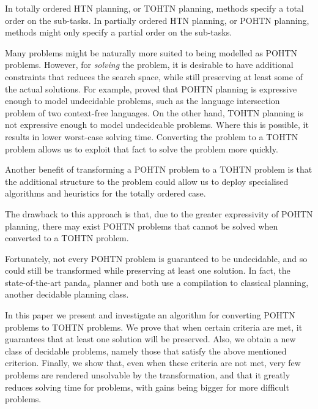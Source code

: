\documentclass[letterpaper]{article} %
\begin{document}
In totally ordered HTN planning, or TOHTN planning, methods specify a total order on the sub-tasks. In partially ordered HTN planning, or POHTN planning, methods might only specify a partial order on the sub-tasks. 


Many problems might be naturally more suited to being modelled as POHTN problems. However, for \emph{solving} the problem, it is desirable to have additional constraints that reduces the search space, while still preserving at least some of the actual solutions. For example, \cite{ErolHTNExpressivity} proved that POHTN planning is expressive enough to model undecidable problems, such as the language intersection problem of two context-free languages. On the other hand, TOHTN planning is not expressive enough to model undecideable problems. Where this is possible, it results in lower worst-case solving time. Converting the problem to a TOHTN problem allows us to exploit that fact to solve the problem more quickly.

Another benefit of transforming a POHTN problem to a TOHTN problem is that the additional structure to the problem could allow us to deploy specialised algorithms and heuristics for the totally ordered case. %

The drawback to this approach is that, due to the greater expressivity of POHTN planning, there may exist POHTN problems that cannot be solved when converted to a TOHTN problem. 

Fortunately, not every POHTN problem is guaranteed to be undecidable, and so could still be transformed while preserving at least one solution. In fact, the state-of-the-art panda$_\pi$ planner and \cite{HTN2SAS} both use a compilation to classical planning, another decidable planning class.
 

In this paper we present and investigate an algorithm for converting POHTN problems to TOHTN problems. We prove that when certain criteria are met, it guarantees that at least one solution will be preserved. 
Also, we obtain a new class of decidable problems, namely those that satisfy the above mentioned criterion. Finally, we show that, even when these criteria are not met, very few problems are rendered unsolvable by the transformation, and that it greatly reduces solving time for problems, with gains being bigger for more difficult problems. 
\end{document}
